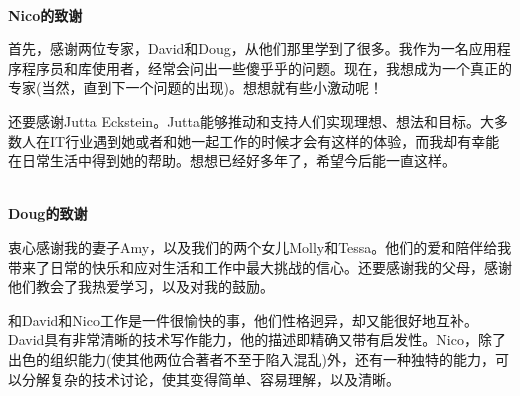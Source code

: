 \hspace*{\fill} \\ %
\noindent\textbf{Nico的致谢}

首先，感谢两位专家，David和Doug，从他们那里学到了很多。我作为一名应用程序程序员和库使用者，经常会问出一些傻乎乎的问题。现在，我想成为一个真正的专家(当然，直到下一个问题的出现)。想想就有些小激动呢！

还要感谢Jutta Eckstein。Jutta能够推动和支持人们实现理想、想法和目标。大多数人在IT行业遇到她或者和她一起工作的时候才会有这样的体验，而我却有幸能在日常生活中得到她的帮助。想想已经好多年了，希望今后能一直这样。

\hspace*{\fill} \\ %
\noindent\textbf{Doug的致谢}

衷心感谢我的妻子Amy，以及我们的两个女儿Molly和Tessa。他们的爱和陪伴给我带来了日常的快乐和应对生活和工作中最大挑战的信心。还要感谢我的父母，感谢他们教会了我热爱学习，以及对我的鼓励。

和David和Nico工作是一件很愉快的事，他们性格迥异，却又能很好地互补。David具有非常清晰的技术写作能力，他的描述即精确又带有启发性。Nico，除了出色的组织能力(使其他两位合著者不至于陷入混乱)外，还有一种独特的能力，可以分解复杂的技术讨论，使其变得简单、容易理解，以及清晰。


